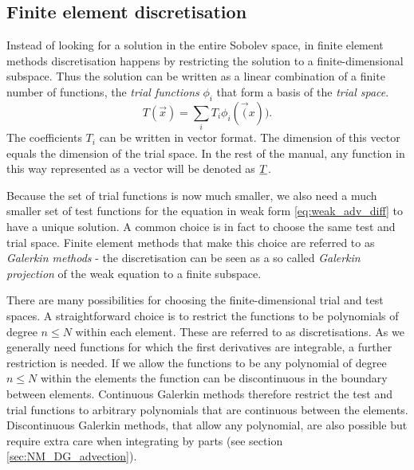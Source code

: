 \subsection{Finite element discretisation}
Instead of looking for a solution in the entire Sobolev space,
in finite element methods discretisation
happens by restricting the solution to a 
finite-dimensional subspace. Thus the solution can be 
written as a linear combination of a finite number of functions,
the \emph{trial functions} $\phi_i$ that form a basis of the 
\emph{trial space}.
\begin{equation*}
  T(\vec{x})=\sum_i T_i \phi_i(\vec(x)).
\end{equation*}
The coefficients $T_i$ can be written in vector format. The 
dimension of this vector equals the dimension of the trial 
space. In the rest of the manual, any function in 
this way represented as a vector will be denoted as $\underline{T}$.

Because the set of trial functions is now much smaller, we also need
a much smaller set of test functions for the equation in weak 
form \eqref{eq:weak_adv_diff} to have a unique 
solution. A common choice is in fact to choose the same
test and trial space. Finite element methods that make this choice are 
referred to as \emph{Galerkin methods} - the discretisation 
can be seen as a so called \emph{Galerkin 
projection} of the weak equation to a finite subspace.

There are many possibilities for choosing the finite-dimensional trial and test spaces. 
A straightforward choice is to restrict the functions to be polynomials of degree 
$n\leq N$ within each element. These are referred to as \PN discretisations. 
As we generally need functions for which the first 
derivatives are integrable, a further restriction 
is needed. If we allow the functions to be any polynomial of 
degree $n\leq N$ within the elements the function can be 
discontinuous in the boundary between elements. 
Continuous Galerkin methods therefore
restrict the test and trial functions to arbitrary polynomials 
that are continuous between the elements. Discontinuous Galerkin methods, 
that allow any polynomial, are also possible but require 
extra care when integrating by parts (see section \ref{sec:NM_DG_advection}).


